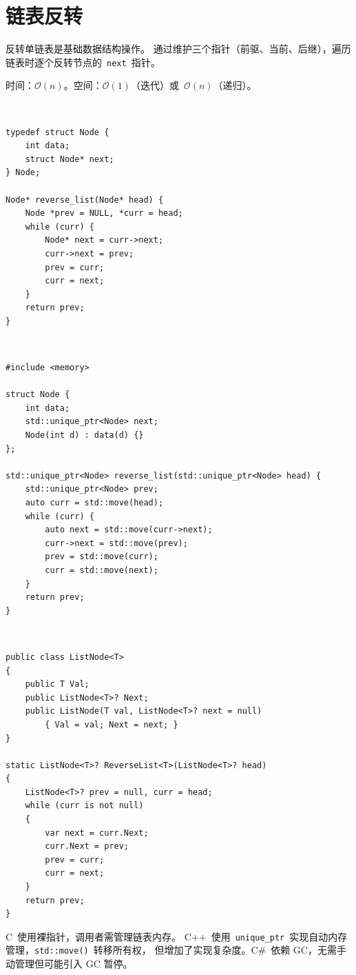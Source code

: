 \documentclass[12pt,a4paper,fontset=fandol]{ctexbook}
\newcommand{\clabel}{%
  \noindent\begin{tcolorbox}[sharp corners,colback=cheadbg,colframe=cheadbg,
    left=6pt,right=6pt,top=2pt,bottom=2pt,boxrule=0pt]
  \textcolor{white}{\small\bfseries\sffamily C}\end{tcolorbox}%
}
\newcommand{\cpplabel}{%
  \noindent\begin{tcolorbox}[sharp corners,colback=cppheadbg,colframe=cppheadbg,
    left=6pt,right=6pt,top=2pt,bottom=2pt,boxrule=0pt]
  \textcolor{white}{\small\bfseries\sffamily C++}\end{tcolorbox}%
}
\newcommand{\csharplabel}{%
  \noindent\begin{tcolorbox}[sharp corners,colback=csharpheadbg,colframe=csharpheadbg,
    left=6pt,right=6pt,top=2pt,bottom=2pt,boxrule=0pt]
  \textcolor{white}{\small\bfseries\sffamily C\#}\end{tcolorbox}%
}
\newcommand{\bigO}[1]{\mathcal{O}(#1)}
\newcommand{\Fn}[1]{\texttt{#1()}}
\newcommand{\Tp}[1]{\texttt{#1}}
\begin{document}
\chapter{链表反转}

反转单链表是基础数据结构操作。
通过维护三个指针（前驱、当前、后继），遍历链表时逐个反转节点的~\texttt{next}~指针。

\begin{complexitybox}
  时间：$\bigO{n}$。空间：$\bigO{1}$（迭代）或~$\bigO{n}$（递归）。
\end{complexitybox}

\clabel
\begin{lstlisting}[style=cstyle]
typedef struct Node {
    int data;
    struct Node* next;
} Node;

Node* reverse_list(Node* head) {
    Node *prev = NULL, *curr = head;
    while (curr) {
        Node* next = curr->next;
        curr->next = prev;
        prev = curr;
        curr = next;
    }
    return prev;
}
\end{lstlisting}

\cpplabel
\begin{lstlisting}[style=cppstyle]
#include <memory>

struct Node {
    int data;
    std::unique_ptr<Node> next;
    Node(int d) : data(d) {}
};

std::unique_ptr<Node> reverse_list(std::unique_ptr<Node> head) {
    std::unique_ptr<Node> prev;
    auto curr = std::move(head);
    while (curr) {
        auto next = std::move(curr->next);
        curr->next = std::move(prev);
        prev = std::move(curr);
        curr = std::move(next);
    }
    return prev;
}
\end{lstlisting}

\csharplabel
\begin{lstlisting}[style=csharpstyle]
public class ListNode<T>
{
    public T Val;
    public ListNode<T>? Next;
    public ListNode(T val, ListNode<T>? next = null)
        { Val = val; Next = next; }
}

static ListNode<T>? ReverseList<T>(ListNode<T>? head)
{
    ListNode<T>? prev = null, curr = head;
    while (curr is not null)
    {
        var next = curr.Next;
        curr.Next = prev;
        prev = curr;
        curr = next;
    }
    return prev;
}
\end{lstlisting}

\begin{compare}
C~使用裸指针，调用者需管理链表内存。
C++~使用~\Tp{unique\_ptr}~实现自动内存管理，\Fn{std::move}~转移所有权，
但增加了实现复杂度。C\#~依赖 GC，无需手动管理但可能引入 GC 暂停。
\end{compare}
\end{document}
